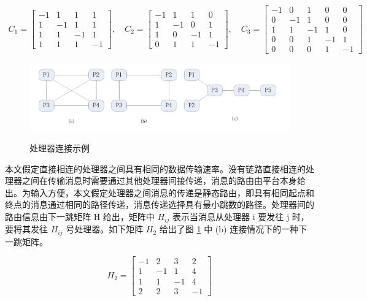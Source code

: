 \begin{gather*}
  C_1=\begin{bmatrix}
      -1 & 1 & 1 & 1 \\
      1 & -1 & 1 & 1 \\
      1 & 1 & -1 & 1 \\
      1 & 1 & 1 & -1
  \end{bmatrix},\quad
  C_2=\begin{bmatrix}
      -1 & 1 & 1 & 0 \\
      1 & -1 & 0 & 1 \\
      1 & 0 & -1 & 1 \\
      0 & 1 & 1 & -1
  \end{bmatrix},\quad
  C_3=\begin{bmatrix}
      -1 & 0 & 1 & 0 & 0\\
      0 & -1 & 1 & 0 & 0\\
      1 & 1 & -1 & 1 & 0\\
      0 & 0 & 1 & -1 & 1\\
      0 & 0 & 0 & 1 & -1
  \end{bmatrix}
\end{gather*}

\begin{figure}[!hbt]
  \centering
  \includegraphics[height=17ex]{figure/DLS-p-connect.pdf}\\
  \caption{处理器连接示例}\label{DLS-fig-connect}
\end{figure}

本文假定直接相连的处理器之间具有相同的数据传输速率。没有链路直接相连的处理器之间在传输消息时需要通过其他处理器间接传递，消息的路由由平台本身给出。为输入方便，本文假定处理器之间消息的传递是静态路由，即具有相同起点和终点的消息通过相同的路径传递，消息传递选择具有最小跳数的路径。处理器间的路由信息由下一跳矩阵 H 给出，矩阵中 $H_{ij}$  表示当消息从处理器 i 要发往 j 时，要将其发往 $H_{ij}$ 号处理器。如下矩阵 $H_2$ 给出了图 \ref{DLS-fig-connect} 中 (b) 连接情况下的一种下一跳矩阵。

\begin{equation*}
  H_2=\begin{bmatrix}
      -1 & 2 & 3 & 2 \\
      1 & -1 & 1 & 4 \\
      1 & 1 & -1 & 4 \\
      2 & 2 & 3 & -1
  \end{bmatrix}
\end{equation*}

